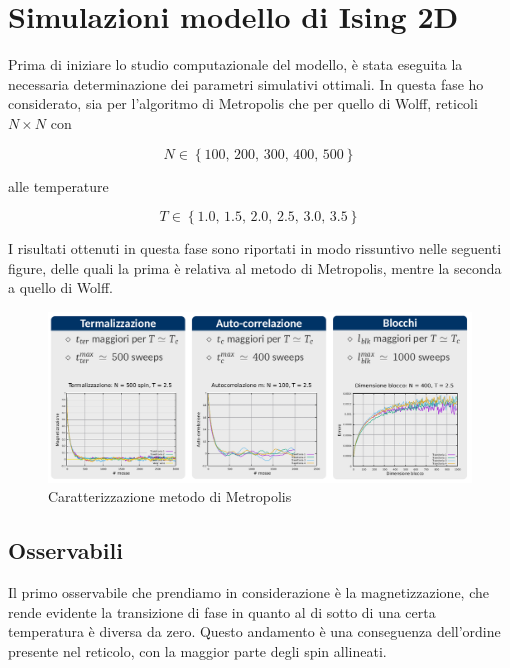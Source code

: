 \section{Simulazioni modello di Ising 2D}

Prima di iniziare lo studio computazionale del modello, è stata eseguita la necessaria determinazione dei 
parametri simulativi ottimali. In questa fase ho considerato, sia per l'algoritmo di Metropolis che per quello 
di Wolff, reticoli $N \times N$ con 

$$
N \in \left\{100,\,200,\,300,\,400,\,500\right\}
$$

alle temperature

$$
T \in \left\{1.0,\,1.5,\,2.0,\,2.5,\,3.0,\,3.5\right\}
$$

I risultati ottenuti in questa fase sono riportati in modo rissuntivo nelle seguenti figure, delle quali la 
prima è relativa al metodo di Metropolis, mentre la seconda a quello di Wolff.

\begin{figure}[H]
    \centering
    \includegraphics[width=\textwidth]{Immagini/simIsing2D/carMetro.png}
    \caption{Caratterizzazione metodo di Metropolis}
    \label{fig: magn_Ising2D}
\end{figure}



\subsection{Osservabili}

Il primo osservabile che prendiamo in considerazione è la magnetizzazione, che rende evidente la transizione di fase in quanto al di 
sotto di una certa temperatura è diversa da zero. Questo andamento è una conseguenza dell'ordine presente nel reticolo, con la 
maggior parte degli spin allineati. 

